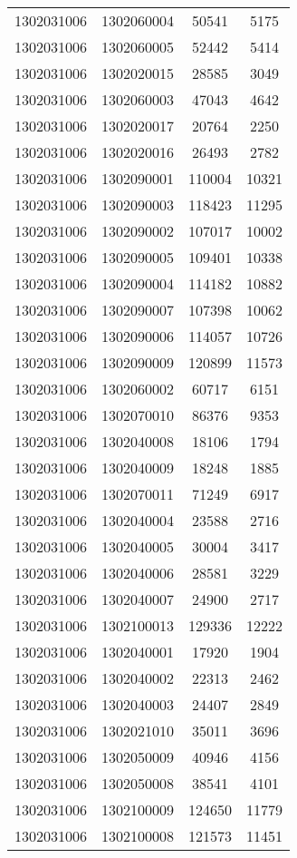 \begin{longtable}{llcc}
1302031006 & 1302060004 & 50541 & 5175\\
1302031006 & 1302060005 & 52442 & 5414\\
1302031006 & 1302020015 & 28585 & 3049\\
1302031006 & 1302060003 & 47043 & 4642\\
1302031006 & 1302020017 & 20764 & 2250\\
1302031006 & 1302020016 & 26493 & 2782\\
1302031006 & 1302090001 & 110004 & 10321\\
1302031006 & 1302090003 & 118423 & 11295\\
1302031006 & 1302090002 & 107017 & 10002\\
1302031006 & 1302090005 & 109401 & 10338\\
1302031006 & 1302090004 & 114182 & 10882\\
1302031006 & 1302090007 & 107398 & 10062\\
1302031006 & 1302090006 & 114057 & 10726\\
1302031006 & 1302090009 & 120899 & 11573\\
1302031006 & 1302060002 & 60717 & 6151\\
1302031006 & 1302070010 & 86376 & 9353\\
1302031006 & 1302040008 & 18106 & 1794\\
1302031006 & 1302040009 & 18248 & 1885\\
1302031006 & 1302070011 & 71249 & 6917\\
1302031006 & 1302040004 & 23588 & 2716\\
1302031006 & 1302040005 & 30004 & 3417\\
1302031006 & 1302040006 & 28581 & 3229\\
1302031006 & 1302040007 & 24900 & 2717\\
1302031006 & 1302100013 & 129336 & 12222\\
1302031006 & 1302040001 & 17920 & 1904\\
1302031006 & 1302040002 & 22313 & 2462\\
1302031006 & 1302040003 & 24407 & 2849\\
1302031006 & 1302021010 & 35011 & 3696\\
1302031006 & 1302050009 & 40946 & 4156\\
1302031006 & 1302050008 & 38541 & 4101\\
1302031006 & 1302100009 & 124650 & 11779\\
1302031006 & 1302100008 & 121573 & 11451\\

\end{longtable}
